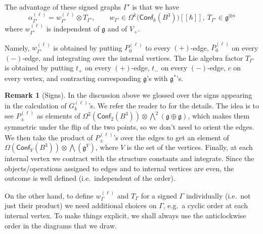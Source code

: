 \documentclass[a4paper]{amsart}
\theoremstyle{plain}
\theoremstyle{definition}
\newtheorem*{rem}{Remark}
\newcommand{\on}{\operatorname}
\newcommand{\g}{\mathfrak{g}}
\newcommand{\bw}{{\textstyle\bigwedge}}
\newcommand{\cf}{\mathsf{Conf}}
\begin{document}
The advantage of these signed graphs $\Gamma'$ is that we have
$$\alpha^{(\ell)}_{\Gamma'} = w^{(\ell)}_{\Gamma'}\otimes T_{\Gamma'},\qquad w_{\Gamma'}\in\Omega^k\bigl(\cf_k(B^3)\bigr)[\![\hbar]\!],\ T_{\Gamma'}\in\g^{\otimes n}$$
where $w^{(\ell)}_{\Gamma'}$ is independent of $\g$ and of $V_+$.

Namely, $w^{(\ell)}_{\Gamma'}$ is obtained by putting $P^{(\ell)}_0$ to every  $(+)$-edge, $\bar P^{(\ell)}_0$ on every  $(-)$-edge, and integrating over the internal vertices. The Lie algebra factor $T_{\Gamma'}$ is obtained by putting $t_+$ on every $(+)$-edge, $t_-$ on every $(-)$-edge, $c$ on every vertex, and contracting corresponding $\g$'s with $\g^*$'s.

\begin{rem}[Signs] 
In the discussion above we glossed over the signs appearing in the calculation of $G_k^{(\ell)}$'s. 
We  refer the reader to \cite{AS} for the details. The idea is to see $P_\pm^{(\ell)}$ as elements of $\Omega^2(\cf_2(B^3))\otimes\bw^2(\g\oplus\g)$, which makes them symmetric under the flip of the two points, so we don't need to orient the edges. We then take the product of $P_\pm^{(\ell)}$'s over the edges to get an element of $\Omega(\cf_V(B^3))\otimes\bw(\g^V)$, where $V$ is the set of the vertices. Finally, at each internal vertex we contract with the structure constants and integrate. Since the objects/operations assigned to edges and to internal vertices are even, the outcome is well defined (i.e.\ independent of the order).

On the other hand, to define $w^{(\ell)}_{\Gamma}$ and $T_{\Gamma}$ for a signed $\Gamma$ individually (i.e.\ not just their product) we need additional choices on $\Gamma$, e.g.\ a cyclic order at each internal vertex. To make things explicit, we shall always use the anticlockwise order in the diagrams that we draw.
\end{rem}

\end{document}
